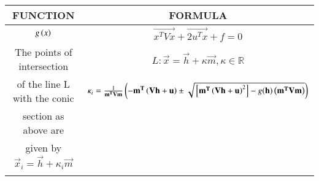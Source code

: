 \begin{tabular}[4pt]{| c| c|}
\hline 
    \textbf{FUNCTION} & \textbf{FORMULA} \\
\hline
    $g\left(x\right)$ & $\vec{x^TVx}+\vec{2u^Tx}+f=0$\\
\hline
    The points of intersection & $ L: \vec{x} = \vec{h} + \kappa\vec{m},  \kappa \in \mathbb{R} $\\ of the line L with the conic &  $ \kappa_i = \frac{1}{\mathbf{m^TVm}}\left(\mathbf{-m^T\left(Vh+u\right)} \pm \sqrt{{}\left[\mathbf{m^T\left(Vh+u\right)}^2\right] - g(\mathbf{h})\left(\mathbf{m^TVm}\right)}\right) $ \\section as above are \\given by $ \vec{x}_i = \vec{h} + \kappa_i\vec{m} $  \\  \\  
\hline
\end{tabular}

